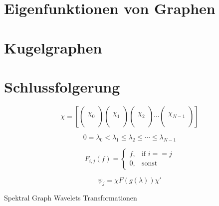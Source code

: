 \begin{refsection}
\section{Eigenfunktionen von Graphen\label{sec:sgwt:eigenfunction}}

\section{Kugelgraphen\label{sec:sgwt:spheregraph}}

\section{Schlussfolgerung}

\begin{equation}
\chi = 
\left[
\begin{pmatrix}\\\chi_0\\\\\end{pmatrix}
\begin{pmatrix}\\\chi_1\\\\\end{pmatrix}
\begin{pmatrix}\\\chi_2\\\\\end{pmatrix}
\cdots
\begin{pmatrix}\\\chi_{N-1}\\\\\end{pmatrix}
\right]
\end{equation}

\begin{equation}
0 = \lambda_0 < \lambda_1 \le \lambda_2 \le \cdots \le \lambda_{N-1}
\end{equation}

\begin{equation}
    F_{i,j}(f) = \begin{cases}
    f, & \text{if } i == j \\
    0, & \text{sonst}
    \end{cases}
\end{equation}

\begin{equation}
\psi_j = \chi F(g(\lambda)) \chi'
\end{equation}

Spektral Graph Wavelets Transformationen 


\cite{hammond_wavelets_2011}
\cite{hammond_image_nodate}
\cite{shuman_emerging_2013}
\cite{xu_graph_2019}
\cite{chung_spectral_nodate}
\cite{spielman_spectral_nodate}
\cite{nica_brief_2018}
\cite{marsden_eigenvalues_nodate}


\printbibliography[heading=subbibliography]
\end{refsection}

